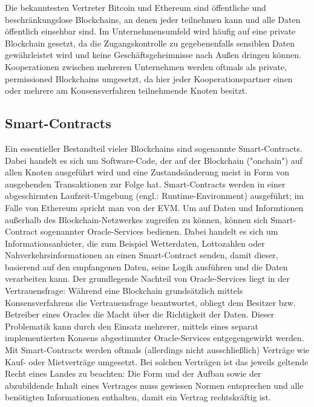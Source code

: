 Die bekanntesten Vertreter Bitcoin und Ethereum sind öffentliche und beschränkungslose Blockchains, an denen jeder teilnehmen kann und alle Daten öffentlich einsehbar sind. Im Unternehmensumfeld wird häufig auf eine private Blockchain gesetzt, da die Zugangskontrolle zu gegebenenfalls sensiblen Daten gewährleistet wird und keine Geschäftsgeheimnisse nach Außen dringen können. Kooperationen zwischen mehreren Unternehmen werden oftmals als private, permissioned Blockchains umgesetzt, da hier jeder Kooperationspartner einen oder mehrere am Konsensverfahren teilnehmende Knoten besitzt.


\subsection{Smart-Contracts}
\label{subsec:fundamentals:dlt:smartcontracts}
Ein essentieller Bestandteil vieler Blockchains sind sogenannte Smart-Contracts. Dabei handelt es sich um Software-Code, der auf der Blockchain ("onchain") auf allen Knoten ausgeführt wird und eine Zustandsänderung meist in Form von ausgehenden Transaktionen zur Folge hat. Smart-Contracts werden in einer abgeschirmten Laufzeit-Umgebung (engl.: Runtime-Environment) ausgeführt; im Falle von Ethereum spricht man von der \ac{EVM}. Um auf Daten und Informtionen außerhalb des Blockchain-Netzwerkes zugreifen zu können, können sich Smart-Contract sogenannter Oracle-Services bedienen. Dabei handelt es sich um Informationsanbieter, die zum Beispiel Wetterdaten, Lottozahlen oder Nahverkehrsinformationen an einen Smart-Contract senden, damit dieser, basierend auf den empfangenen Daten, seine Logik ausführen und die Daten verarbeiten kann. Der grundlegende Nachteil von Oracle-Services liegt in der Vertrauensfrage: Während eine Blockchain grundsätzlich mittels Konsensverfahrens die Vertrauensfrage beantwortet, obliegt dem Besitzer bzw. Betreiber eines Oracles die Macht über die Richtigkeit der Daten. Dieser Problematik kann durch den Einsatz mehrerer, mittels eines separat implementierten Konsens abgestimmter Oracle-Services entgegengewirkt werden.\\
Mit Smart-Contracts werden oftmals (allerdings nicht ausschließlich) Verträge wie Kauf- oder Mietverträge umgesetzt. Bei solchen Verträgen ist das jeweils geltende Recht eines Landes zu beachten: Die Form und der Aufbau sowie der abzubildende Inhalt eines Vertrages muss gewissen Normen entsprechen und alle benötigten Informationen enthalten, damit ein Vertrag rechtskräftig ist.


